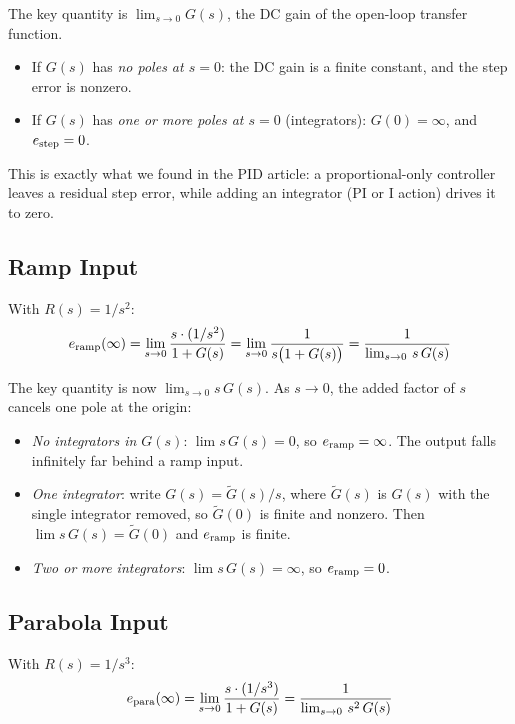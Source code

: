 \documentclass[12pt]{article}
\begin{document}
The key quantity is $\lim_{s\to 0} G(s)$, the DC gain of the open-loop
transfer function.
\begin{itemize}
  \item If $G(s)$ has \emph{no poles at $s = 0$}: the DC gain is a finite
    constant, and the step error is nonzero.
  \item If $G(s)$ has \emph{one or more poles at $s = 0$} (integrators):
    $G(0) = \infty$, and $e_{\rm step} = 0$.
\end{itemize}

This is exactly what we found in the PID article: a proportional-only controller
leaves a residual step error, while adding an integrator (PI or I action) drives
it to zero.

\subsection{Ramp Input}

With $R(s) = 1/s^2$:
\begin{equation}
  e_{\rm ramp}(\infty)
    = \lim_{s \to 0} \frac{s \cdot (1/s^2)}{1 + G(s)}
    = \lim_{s \to 0} \frac{1}{s\bigl(1 + G(s)\bigr)}
    = \frac{1}{\lim_{s \to 0}\, s\,G(s)}
  \label{eq:ess_ramp}
\end{equation}

The key quantity is now $\lim_{s\to 0} s\,G(s)$.  As $s \to 0$, the added
factor of $s$ cancels one pole at the origin:
\begin{itemize}
  \item \emph{No integrators in $G(s)$}: $\lim s\,G(s) = 0$, so
    $e_{\rm ramp} = \infty$.  The output falls infinitely far behind a ramp
    input.
  \item \emph{One integrator}: write $G(s) = \widetilde{G}(s)/s$, where
    $\widetilde{G}(s)$ is $G(s)$ with the single integrator removed, so
    $\widetilde{G}(0)$ is finite and nonzero.  Then $\lim s\,G(s) =
    \widetilde{G}(0)$ and $e_{\rm ramp}$ is finite.
  \item \emph{Two or more integrators}: $\lim s\,G(s) = \infty$, so
    $e_{\rm ramp} = 0$.
\end{itemize}

\subsection{Parabola Input}

With $R(s) = 1/s^3$:
\begin{equation}
  e_{\rm para}(\infty)
    = \lim_{s \to 0} \frac{s \cdot (1/s^3)}{1 + G(s)}
    = \frac{1}{\lim_{s \to 0}\, s^2\,G(s)}
  \label{eq:ess_para}
\end{equation}
\end{document}
